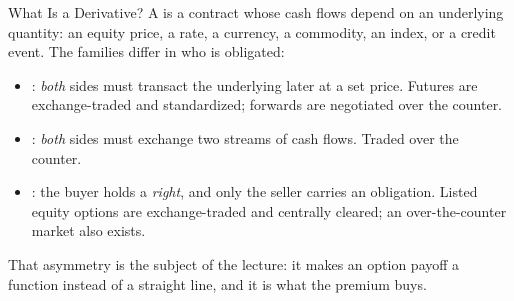 \documentclass[aspectratio=169,11pt]{beamer}
\begin{document}
\begin{frame}{What Is a Derivative?}
  A  is a contract whose cash flows depend on an underlying
  quantity: an equity price, a rate, a currency, a commodity, an index, or a
  credit event. The families differ in who is obligated:
  \vspace{0.3em}
  \begin{itemize}\setlength{\itemsep}{0.25em}
    \item {}: \textit{both} sides must transact the
      underlying later at a set price. Futures are exchange-traded and
      standardized; forwards are negotiated over the counter.
    \item {}: \textit{both} sides must exchange two streams of cash
      flows. Traded over the counter.
    \item {}: the buyer holds a \textit{right}, and only the seller
      carries an obligation. Listed equity options are exchange-traded and
      centrally cleared; an over-the-counter market also exists.
  \end{itemize}
  \vspace{0.3em}
  That asymmetry is the subject of the lecture: it makes an option payoff a
   function instead of a straight line, and it is what the
  premium buys.
\end{frame}
\end{document}
